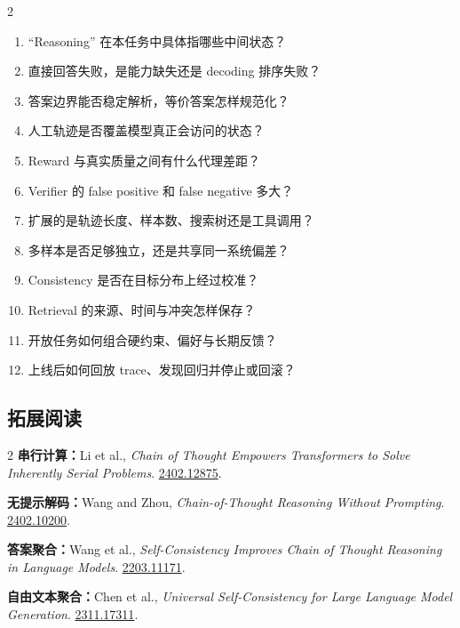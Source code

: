 \documentclass[a4paper]{article}
\begin{document}
\small
\begin{multicols}{2}
\begin{enumerate}
  \item “Reasoning” 在本任务中具体指哪些中间状态？
  \item 直接回答失败，是能力缺失还是 decoding 排序失败？
  \item 答案边界能否稳定解析，等价答案怎样规范化？
  \item 人工轨迹是否覆盖模型真正会访问的状态？
  \item Reward 与真实质量之间有什么代理差距？
  \item Verifier 的 false positive 和 false negative 多大？
  \item 扩展的是轨迹长度、样本数、搜索树还是工具调用？
  \item 多样本是否足够独立，还是共享同一系统偏差？
  \item Consistency 是否在目标分布上经过校准？
  \item Retrieval 的来源、时间与冲突怎样保存？
  \item 开放任务如何组合硬约束、偏好与长期反馈？
  \item 上线后如何回放 trace、发现回归并停止或回滚？
\end{enumerate}
\end{multicols}
\normalsize

\subsection{拓展阅读}

\scriptsize
\begin{multicols}{2}
\noindent\textbf{串行计算：}Li et al., \emph{Chain of Thought Empowers Transformers to Solve Inherently Serial Problems}. \href{https://arxiv.org/abs/2402.12875}{2402.12875}.\par
\noindent\textbf{无提示解码：}Wang and Zhou, \emph{Chain-of-Thought Reasoning Without Prompting}. \href{https://arxiv.org/abs/2402.10200}{2402.10200}.\par
\noindent\textbf{答案聚合：}Wang et al., \emph{Self-Consistency Improves Chain of Thought Reasoning in Language Models}. \href{https://arxiv.org/abs/2203.11171}{2203.11171}.\par
\noindent\textbf{自由文本聚合：}Chen et al., \emph{Universal Self-Consistency for Large Language Model Generation}. \href{https://arxiv.org/abs/2311.17311}{2311.17311}.\par
\end{multicols}
\normalsize
\end{document}
